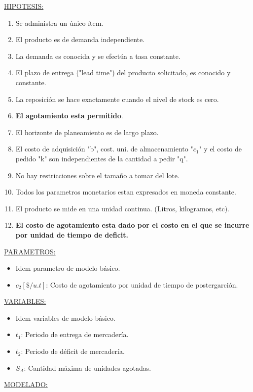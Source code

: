 \documentclass{article}
\begin{document}
\noindent
\underline{HIPOTESIS:}
\begin{enumerate}
    \item Se administra un único ítem.
    \item El producto es de demanda independiente.
    \item La demanda es conocida y se efectúa a tasa constante.
    \item El plazo de entrega ("lead time") del producto solicitado, es conocido y constante.
    \item La reposición se hace exactamente cuando el nivel de stock es cero.
    \item \textbf{El agotamiento esta permitido}. 
    \item El horizonte de planeamiento es de largo plazo.
    \item El costo de adquisición "b", cost. uni. de almacenamiento "\(c_1\)" y el costo de pedido "k" son independientes de la cantidad a pedir "q".
    \item No hay restricciones sobre el tamaño a tomar del lote.
    \item Todos los parametros monetarios estan expresados en moneda constante.
    \item El producto se mide en una unidad continua. (Litros, kilogramos, etc).
    \item \textbf{El costo de agotamiento esta dado por el costo en el que se incurre por unidad de tiempo de deficit.}
\end{enumerate}

\noindent
\underline{PARAMETROS:}
\begin{itemize}
    \item Idem parametro de modelo básico.
    \item \(c_2[\$/u.t]\): Costo de agotamiento por unidad de tiempo de postergarción.
\end{itemize}

\noindent
\underline{VARIABLES:}
\begin{itemize}
    \item Idem variables de modelo básico.
    \item \(t_1\): Periodo de entrega de mercadería.
    \item \(t_2\): Periodo de déficit de mercadería.
    \item \(S_A\): Cantidad máxima de unidades agotadas.
\end{itemize}


\newpage
\underline{MODELADO:}
\end{document}
